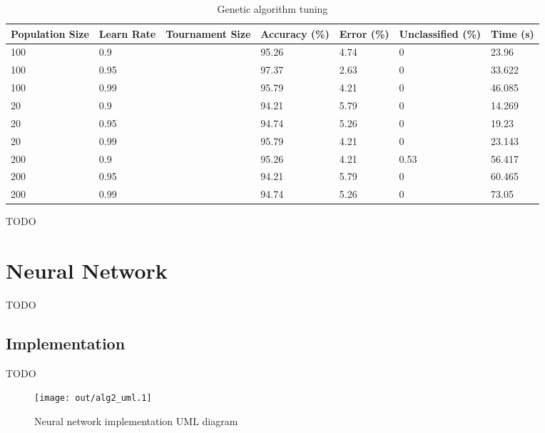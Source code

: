 \documentclass[a4paper]{article}
\begin{document}
\begin{table}[]
  \centering
  \begin{tabular}{@{}lllllll@{}}
    \toprule
    Population Size & Learn Rate & Tournament Size & Accuracy (\%) & Error (\%) & Unclassified (\%) & Time (s) \\
    \midrule
    100             & 0.9        &                 & 95.26         & 4.74       & 0                 & 23.96    \\
    100             & 0.95       &                 & 97.37         & 2.63       & 0                 & 33.622   \\
    100             & 0.99       &                 & 95.79         & 4.21       & 0                 & 46.085   \\
    20              & 0.9        &                 & 94.21         & 5.79       & 0                 & 14.269   \\
    20              & 0.95       &                 & 94.74         & 5.26       & 0                 & 19.23    \\
    20              & 0.99       &                 & 95.79         & 4.21       & 0                 & 23.143   \\
    200             & 0.9        &                 & 95.26         & 4.21       & 0.53              & 56.417   \\
    200             & 0.95       &                 & 94.21         & 5.79       & 0                 & 60.465   \\
    200             & 0.99       &                 & 94.74         & 5.26       & 0                 & 73.05    \\
    \bottomrule
  \end{tabular}
  \caption{Genetic algorithm tuning}
  \label{tab:ga_tuning}
\end{table}

TODO

\section{Neural Network}

TODO

\subsection{Implementation}

TODO

\begin{figure}[h!]
  \centering
  \texttt{[image: out/alg2\_uml.1]}
  \caption{Neural network implementation UML diagram}
  \label{fig:alg2_uml}
\end{figure}
\end{document}
